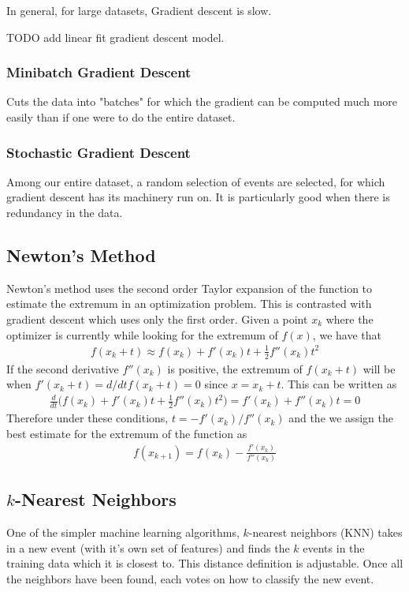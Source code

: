 In general, for large datasets, Gradient descent is slow.

TODO add linear fit gradient descent model.

\subsubsection{Minibatch Gradient Descent}
Cuts the data into "batches" for which the gradient can be computed much more easily than if one were to do the entire dataset.

\subsubsection{Stochastic Gradient Descent}
Among our entire dataset, a random selection of events are selected, for which gradient descent has its machinery run on. It is particularly good when there is redundancy in the data.

\subsection{Newton's Method}
Newton's method uses the second order Taylor expansion of the function to estimate the extremum in an optimization problem. This is contrasted with gradient descent which uses only the first order. Given a point $x_k$ where the optimizer is currently while looking for the extremum of $f(x)$, we have that
\begin{align}
	f(x_k+t)\approx f(x_k) + f'(x_k)t + \frac{1}{2}f''(x_k)t^2
\end{align}
If the second derivative $f''(x_k)$ is positive, the extremum of $f(x_k+t)$ will be when $f'(x_k+t) = d/dt f(x_k+t) = 0$ since $x=x_k+t$. This can be written as 
\begin{align}
	\frac{d}{dt}\Big( f(x_k) + f'(x_k)t + \frac{1}{2}f''(x_k)t^2\Big) = f'(x_k)+f''(x_k)t = 0 
\end{align}
Therefore under these conditions, $t = -f'(x_k)/f''(x_k)$ and the we assign the best estimate for the extremum of the function as
\begin{align}
	f(x_{k+1}) = f(x_k)-\frac{f'(x_k)}{f''(x_k)}
\end{align} 


\subsection{$k$-Nearest Neighbors}\label{sub:knn}
One of the simpler machine learning algorithms, $k$-nearest neighbors (KNN) takes in a new event (with it's own set of features) and finds the  $k$ events in the training data which it is closest to. This distance definition is adjustable. Once all the neighbors have been found, each votes on how to classify the new event.

